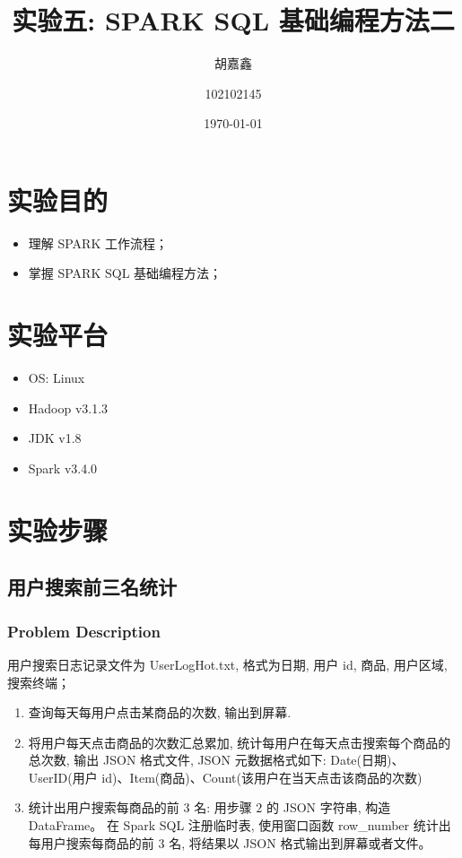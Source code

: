 \documentclass{article}
\title{实验五: SPARK SQL 基础编程方法二}
\author{胡嘉鑫 \and 102102145}
\date{\today}
\begin{document}
\maketitle
\tableofcontents

\section{实验目的}
\begin{itemize}
  \item 理解 SPARK 工作流程；
  \item 掌握 SPARK SQL 基础编程方法；
\end{itemize}

\section{实验平台}
\begin{itemize}
  \item OS: Linux
  \item Hadoop v3.1.3
  \item JDK v1.8
  \item Spark v3.4.0
\end{itemize}

\section{实验步骤}
\subsection{用户搜索前三名统计}
\subsubsection{Problem Description}
用户搜索日志记录文件为 UserLogHot.txt, 格式为日期, 用户 id, 商品, 用户区域,
搜索终端；
\begin{enumerate}
  \item 查询每天每用户点击某商品的次数, 输出到屏幕.
  \item 将用户每天点击商品的次数汇总累加,
    统计每用户在每天点击搜索每个商品的总次数,
    输出 JSON 格式文件, JSON 元数据格式如下:
    Date(日期)、UserID(用户 id)、Item(商品)、Count(该用户在当天点击该商品的次数)
  \item 统计出用户搜索每商品的前 $ 3 $ 名:
    用步骤 $ 2 $ 的 JSON 字符串, 构造DataFrame。
    在 Spark SQL 注册临时表, 使用窗口函数 row\_number 统计出每用户搜索每商品的前
    $ 3 $ 名, 将结果以 JSON 格式输出到屏幕或者文件。
\end{enumerate}
\end{document}
